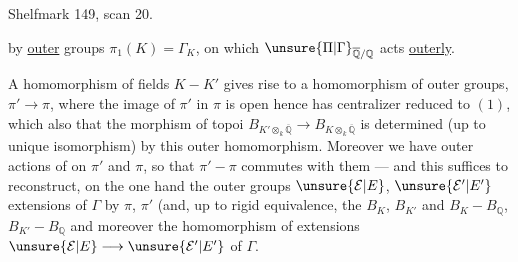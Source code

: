 Shelfmark 149, scan 20.

by  \uline{outer} groups $\pi_1(K)=\Gamma_K$, on which  $\unsure{\Pi|\Gamma}_{\overline{\mathbb Q}/\mathbb Q}$ acts \uline{outerly}.

A homomorphism of fields $K-K'$ gives rise to a homomorphism of outer groups,
 $\pi'\longrightarrow\pi$, where the image of $\pi'$ in $\pi$ is open hence has centralizer reduced to $(1)$, which also  that the morphism of topoi $B_{K'\otimes_k\overline{\mathbb Q}}\longrightarrow B_{K\otimes_k\overline{\mathbb Q}}$ is determined (up to unique isomorphism) by this outer homomorphism. Moreover we have outer actions of  on $\pi'$ and $\pi$, so that $\pi'-\pi$ commutes with them --- and this suffices to reconstruct, on the one hand the outer groups $\unsure{\mathcal E|E}$, $\unsure{\mathcal E'|E'}$ extensions  of $\Gamma$ by $\pi$, $\pi'$ (and, up to rigid equivalence, the $B_K$, $B_{K'}$ and $B_K-B_{\mathbb Q}$, $B_{K'}-B_{\mathbb Q}$ and moreover the homomorphism of extensions  $\unsure{\mathcal E|E}\longrightarrow\unsure{\mathcal E'|E'}$ of $\Gamma$.
